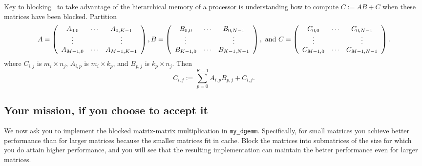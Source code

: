 Key to blocking \Gemm\ to take advantage of the hierarchical memory of
a processor is understanding how to compute $ C := A B + C $ when
these matrices have been blocked.  Partition
{\footnotesize%
\[
A = 
\left( \begin{array}{c c c c}
A_{0,0} & \cdots & A_{0,K-1} \\
\vdots &  & \vdots \\
A_{M-1,0} & \cdots & A_{M-1,K-1} \\
\end{array}
\right),
B = 
\left( \begin{array}{c c c c}
B_{0,0} & \cdots & B_{0,N-1} \\
\vdots &  & \vdots \\
B_{K-1,0} & \cdots & B_{K-1,N-1} \\
\end{array}
\right), \mbox{~and~}
C = 
\left( \begin{array}{c c c c}
C_{0,0} & \cdots & C_{0,N-1} \\
\vdots &  & \vdots \\
C_{M-1,0} & \cdots & C_{M-1,N-1} \\
\end{array}
\right).
\]%
}
where $ C_{i,j} $ is $ m_i \times n_j
$, $ A_{i,p} $ is $ m_i \times k_p
$, and $ B_{p,j} $ is $ k_p \times n_j
$.
Then
\[
C_{i,j} := \sum_{p=0}^{K-1} A_{i,p} B_{p,j} + C_{i,j}.
\]

\subsection{Your mission, if you choose to accept it}
We now ask you to implement the blocked matrix-matrix multiplication in {\tt my\_dgemm}.
Specifically, for small matrices you achieve better performance than for larger matrices because the smaller matrices fit in cache.  Block the matrices into submatrices of the size for which you do attain higher performance, and you will see that the resulting implementation can maintain the better performance even for larger matrices.
